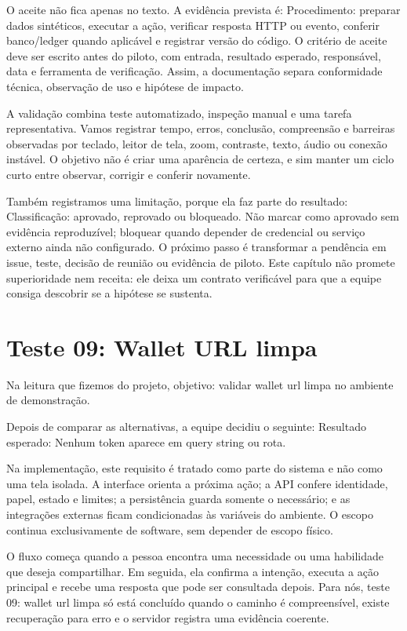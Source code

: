 \documentclass[12pt,oneside,a4paper,article]{abntex2}
\begin{document}
O aceite não fica apenas no texto. A evidência prevista é: Procedimento: preparar dados sintéticos, executar a ação, verificar resposta HTTP ou evento, conferir banco/ledger quando aplicável e registrar versão do código. O critério de aceite deve ser escrito antes do piloto, com entrada, resultado esperado, responsável, data e ferramenta de verificação. Assim, a documentação separa conformidade técnica, observação de uso e hipótese de impacto.

A validação combina teste automatizado, inspeção manual e uma tarefa representativa. Vamos registrar tempo, erros, conclusão, compreensão e barreiras observadas por teclado, leitor de tela, zoom, contraste, texto, áudio ou conexão instável. O objetivo não é criar uma aparência de certeza, e sim manter um ciclo curto entre observar, corrigir e conferir novamente.

Também registramos uma limitação, porque ela faz parte do resultado: Classificação: aprovado, reprovado ou bloqueado. Não marcar como aprovado sem evidência reproduzível; bloquear quando depender de credencial ou serviço externo ainda não configurado. O próximo passo é transformar a pendência em issue, teste, decisão de reunião ou evidência de piloto. Este capítulo não promete superioridade nem receita: ele deixa um contrato verificável para que a equipe consiga descobrir se a hipótese se sustenta.

\section{Teste 09: Wallet URL limpa}
Na leitura que fizemos do projeto, objetivo: validar wallet url limpa no ambiente de demonstração.

Depois de comparar as alternativas, a equipe decidiu o seguinte: Resultado esperado: Nenhum token aparece em query string ou rota.

Na implementação, este requisito é tratado como parte do sistema e não como uma tela isolada. A interface orienta a próxima ação; a API confere identidade, papel, estado e limites; a persistência guarda somente o necessário; e as integrações externas ficam condicionadas às variáveis do ambiente. O escopo continua exclusivamente de software, sem depender de escopo físico.

O fluxo começa quando a pessoa encontra uma necessidade ou uma habilidade que deseja compartilhar. Em seguida, ela confirma a intenção, executa a ação principal e recebe uma resposta que pode ser consultada depois. Para nós, teste 09: wallet url limpa só está concluído quando o caminho é compreensível, existe recuperação para erro e o servidor registra uma evidência coerente.
\end{document}
